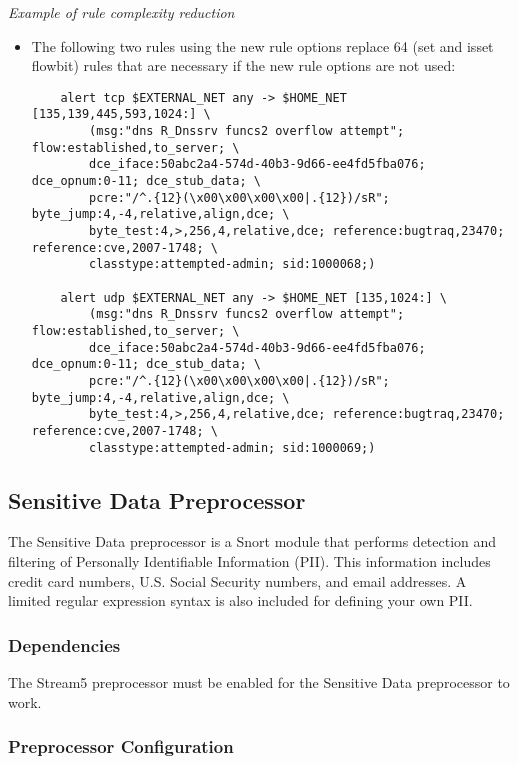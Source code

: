 \documentclass[english]{report}
\begin{document}
\textit{Example of rule complexity reduction}
\begin{itemize}

\item[] The following two rules using the new rule options replace 64 (set and
isset flowbit) rules that are necessary if the new rule options are not used:

\footnotesize
\begin{verbatim}
    alert tcp $EXTERNAL_NET any -> $HOME_NET [135,139,445,593,1024:] \
        (msg:"dns R_Dnssrv funcs2 overflow attempt"; flow:established,to_server; \
        dce_iface:50abc2a4-574d-40b3-9d66-ee4fd5fba076; dce_opnum:0-11; dce_stub_data; \
        pcre:"/^.{12}(\x00\x00\x00\x00|.{12})/sR"; byte_jump:4,-4,relative,align,dce; \
        byte_test:4,>,256,4,relative,dce; reference:bugtraq,23470; reference:cve,2007-1748; \
        classtype:attempted-admin; sid:1000068;)

    alert udp $EXTERNAL_NET any -> $HOME_NET [135,1024:] \
        (msg:"dns R_Dnssrv funcs2 overflow attempt"; flow:established,to_server; \
        dce_iface:50abc2a4-574d-40b3-9d66-ee4fd5fba076; dce_opnum:0-11; dce_stub_data; \
        pcre:"/^.{12}(\x00\x00\x00\x00|.{12})/sR"; byte_jump:4,-4,relative,align,dce; \
        byte_test:4,>,256,4,relative,dce; reference:bugtraq,23470; reference:cve,2007-1748; \
        classtype:attempted-admin; sid:1000069;)
\end{verbatim}
\normalsize
\end{itemize}

\subsection{Sensitive Data Preprocessor}
\label{sub:sensitive_data}

The Sensitive Data preprocessor is a Snort module that performs detection and
filtering of Personally Identifiable Information (PII). This information
includes credit card numbers, U.S. Social Security numbers, and email addresses.
A limited regular expression syntax is also included for defining your own PII.

\subsubsection{Dependencies}

The Stream5 preprocessor must be enabled for the Sensitive Data preprocessor
to work.

\subsubsection{Preprocessor Configuration}
\end{document}
